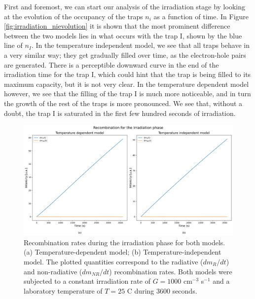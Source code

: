 \vspace{10pt}

First and foremost, we can start our analysis of the irradiation stage by looking at the evolution of the occupancy of the traps $n_i$ as a function of time. In Figure \ref{fig:irradiation_nievolution} it is shown that the most prominent difference between the two models lies in what occurs with the trap I, shown by the blue line of $n_I$. In the temperature independent model, we see that all traps behave in a very similar way; they get gradually filled over time, as the electron-hole pairs are generated. There is a perceptible downward curve in the end of the irradiation time for the trap I, which could hint that the trap is being filled to its maximum capacity, but it is not very clear. In the temperature dependent model however, we see that the filling of the trap I is much more noticeable, and in turn the growth of the rest of the traps is more pronounced. We see that, without a doubt, the trap I is saturated in the first few hundred seconds of irradiation.

\begin{figure}
    \centering
    \includegraphics[width=\textwidth]{Images/Irradiation Recombination.png}
    \caption[Radiative and non-radiative recombination rates during the irradiation phase for both models.]{Recombination rates during the irradiation phase for both models. (a) Temperature-dependent model; (b) Temperature-independent model. The plotted quantities correspond to the radiative ($dm_R/dt$) and non-radiative ($dm_{NR}/dt$) recombination rates. Both models were subjected to a constant irradiation rate of $G = 1000$ cm$^{-3}$ s$^{-1}$ and a laboratory temperature of $T = 25$ \textdegree C during 3600 seconds.}
    \label{fig:irradiation_recombination}
\end{figure}


